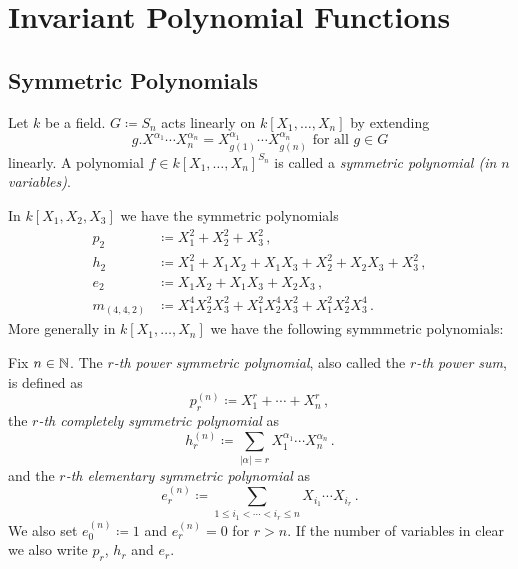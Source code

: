 \chapter{Invariant Polynomial Functions}











\section{Symmetric Polynomials}


\begin{definition}
  Let $k$ be a field.
  $G \coloneqq S_n$ acts linearly on $k[X_1, \dotsc, X_n]$ by extending
  \[
      g.X^{\alpha_1} \dotsm X_n^{\alpha_n}
    = X_{g(1)}^{\alpha_1} \dotsm X_{g(n)}^{\alpha_n}
    \text{ for all }
    g \in G
  \]
  linearly.
  A polynomial $f \in k[X_1, \dotsc, X_n]^{S_n}$ is called a \emph{symmetric polynomial (in $n$ variables)}.
\end{definition}


\begin{example}
  In $k[X_1, X_2, X_3]$ we have the symmetric polynomials
  \begin{align*}
                p_2
    &\coloneqq  X_1^2 + X_2^2 + X_3^2 \,,
    \\
                h_2
    &\coloneqq  X_1^2 + X_1 X_2 + X_1 X_3 + X_2^2 + X_2 X_3 + X_3^2 \,,
    \\
                e_2
    &\coloneqq  X_1 X_2 + X_1 X_3 + X_2 X_3 \,,
    \\
                m_{(4,4,2)}
    &\coloneqq  X_1^4 X_2^2 X_3^2 + X_1^2 X_2^4 X_3^2 + X_1^2 X_2^2 X_3^4 \,.
  \end{align*}
  More generally in $k[X_1, \dotsc, X_n]$ we have the following symmmetric polynomials:
\end{example}


\begin{definition}
  Fix $n \in \mathbb{N}$.
  The \emph{$r$-th power symmetric polynomial}, also called the \emph{$r$-th power sum}, is defined as
  \[
              p_r^{(n)}
    \coloneqq X_1^r + \dotsb + X_n^r \,,
  \]
  the \emph{$r$-th completely symmetric polynomial} as
  \[
              h_r^{(n)}
    \coloneqq \sum_{|\alpha|=r} X_1^{\alpha_1} \dotsm X_n^{\alpha_n} \,.
  \]
  and the \emph{$r$-th elementary symmetric polynomial} as
  \[
              e_r^{(n)}
    \coloneqq \sum_{1 \leq i_1 < \dotsb < i_r \leq n} X_{i_1} \dotsm X_{i_r} \,.
  \]
  We also set $e_0^{(n)} \coloneqq 1$ and $e_r^{(n)} = 0$ for $r > n$.
  If the number of variables in clear we also write $p_r$, $h_r$ and $e_r$.
\end{definition}


